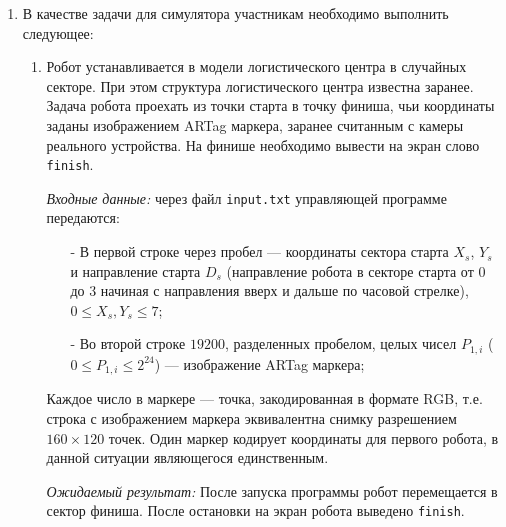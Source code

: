 

\begin{enumerate}
    \item В качестве задачи для симулятора участникам необходимо выполнить следующее:
    \begin{enumerate}
        \item Робот устанавливается в модели логистического центра в случайных
        секторе. При этом структура логистического центра известна заранее.
        Задача робота проехать из точки старта в точку финиша, чьи
        координаты заданы изображением ARTag маркера, заранее считанным с камеры реального
        устройства. На финише необходимо вывести на экран слово \texttt{finish}.

        \textit{Входные данные:} через файл \texttt{input.txt} управляющей программе передаются:
        \begin{enumerate}
            \item[-] В первой строке через пробел --- координаты сектора старта $X_s$, $Y_s$ и направление старта $D_s$
                    (направление робота в секторе старта от 0 до 3 начиная с направления вверх и дальше
                    по часовой стрелке), $0 \le X_s, Y_s \le 7$;
            \item[-] Во второй строке $19200$, разделенных пробелом, целых чисел $P_{1,i}$
                    ($0 \le P_{1,i} \le 2^{24}$) --- изображение ARTag маркера;
        \end{enumerate}
        Каждое число в маркере --- точка, закодированная в формате RGB, т.е. строка с изображением
        маркера эквивалентна снимку разрешением $160 \times 120$ точек. Один маркер кодирует 
        координаты для первого робота, в данной ситуации являющегося единственным.
        
        \textit{Ожидаемый результат:} После запуска программы робот перемещается в сектор финиша.
                После остановки на экран робота выведено \texttt{finish}.


\end{enumerate}
\end{enumerate}
